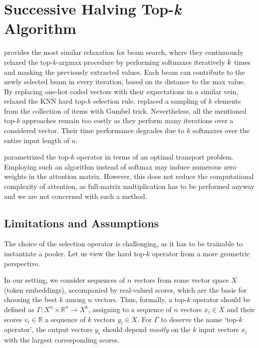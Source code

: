 \documentclass{article}
\newcommand{\RR}{\mathbb{R}}
\begin{document}
\section{Successive Halving Top-\textit{k} Algorithm}\label{appendix_topk}
\citet{goyal2017continuous} provides the most similar relaxation for beam search, where they continuously relaxed the top-$k$-argmax procedure by performing softmaxes iteratively $\mathnormal{k}$ times and masking the previously extracted values. Each beam can contribute to the newly selected beam in every iteration, based on its distance to the max value.
By replacing one-hot coded vectors with their expectations in a similar vein, \citet{pltz2018neural} relaxed the KNN hard top-$k$ selection rule. 
\citet{xie2019reparameterizable} replaced a sampling of $k$ elements from the collection of items with Gumbel trick. 
Nevertheless, all the mentioned top-$k$ approaches remain too costly as they perform many iterations over a considered vector. Their time performance degrades due to $k$ softmaxes over the entire input length of $n$.

\citet{xie2020differentiable} parametrized the top-$k$ operator in terms of an optimal transport problem.  Employing such an algorithm instead of softmax may induce numerous zero weights in the attention matrix. However, this does not reduce the computational complexity of attention, as full-matrix multiplication has to be performed anyway and we are not concerned with such a method.


\subsection{Limitations and Assumptions\label{sec:limitations}}

The choice of the selection operator is challenging, as it has to be trainable to instantiate a pooler. Let us view the hard top-$k$ operator from a more geometric perspective.


In our setting, we consider sequences of \(n\) vectors from some vector space \(X\) (token embeddings), accompanied by real-valued scores, which are the basis for choosing the best \(k\) among \(n\) vectors. Thus, formally, a top-\(k\) operator should be defined as \(\Gamma\colon X^{n}\times \RR^{n}\to X^{k}\), assigning to a sequence of \(n\) vectors \(x_{i}\in X\) and their scores \(v_{i} \in \RR\) a sequence of \(k\) vectors \(y_{i}\in X\). For \(\Gamma\) to deserve the name `top-\(k\) operator', the output vectors \(y_{i}\) should depend \emph{mostly} on the \(k\) input vectors \(x_{i}\) with the largest corresponding scores.
\end{document}
